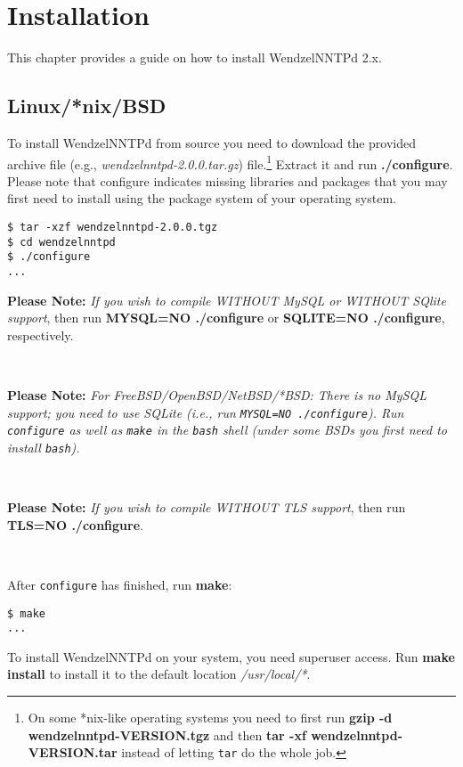 \chapter{Installation}

This chapter provides a guide on how to install WendzelNNTPd 2.x.

\section{Linux/*nix/BSD}

To install WendzelNNTPd from source you need to download the provided archive file (e.g., \emph{wendzelnntpd-2.0.0.tar.gz}) file.\footnote{On some *nix-like operating systems you need to first run \textbf{gzip -d wendzelnntpd-VERSION.tgz} and then \textbf{tar -xf wendzelnntpd-VERSION.tar} instead of letting \texttt{tar} do the whole job.} Extract it and run \textbf{./configure}. Please note that configure indicates missing libraries and packages that you may first need to install using the package system of your operating system.

\begin{verbatim}
$ tar -xzf wendzelnntpd-2.0.0.tgz
$ cd wendzelnntpd
$ ./configure
...
\end{verbatim}

\textbf{Please Note:} \textit{If you wish to compile WITHOUT MySQL or WITHOUT SQlite support}, then run \textbf{MYSQL=NO ./configure} or \textbf{SQLITE=NO ./configure}, respectively.

~

\textbf{Please Note:} \textit{For FreeBSD/OpenBSD/NetBSD/*BSD: There is no MySQL support; you need to use SQLite (i.e., run \texttt{MYSQL=NO ./configure}). Run \texttt{configure} as well as \texttt{make} in the \texttt{bash} shell (under some BSDs you first need to install \texttt{bash}).}

~

\textbf{Please Note:} \textit{If you wish to compile WITHOUT TLS support}, then run \textbf{TLS=NO ./configure}.

~

After \texttt{configure} has finished, run \textbf{make}:

\begin{verbatim}
$ make
...
\end{verbatim}

To install WendzelNNTPd on your system, you need superuser access. Run \textbf{make install} to install it to the default location \textit{/usr/local/*}.


